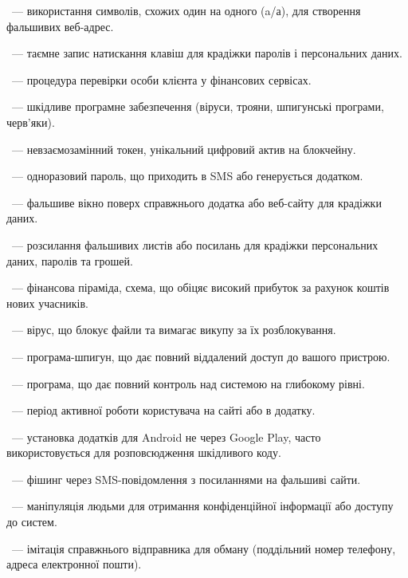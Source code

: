 ~--- використання символів, схожих один на одного (a/а), для створення фальшивих веб-адрес.

~--- таємне запис натискання клавіш для крадіжки паролів і персональних даних.

~--- процедура перевірки особи клієнта у фінансових сервісах.

~--- шкідливе програмне забезпечення (віруси, трояни, шпигунські програми, черв'яки).

~--- невзаємозамінний токен, унікальний цифровий актив на блокчейну.

~--- одноразовий пароль, що приходить в SMS або генерується додатком.

~--- фальшиве вікно поверх справжнього додатка або веб-сайту для крадіжки даних.

~--- розсилання фальшивих листів або посилань для крадіжки персональних даних, паролів та грошей.

~--- фінансова піраміда, схема, що обіцяє високий прибуток за рахунок коштів нових учасників.

~--- вірус, що блокує файли та вимагає викупу за їх розблокування.

~--- програма-шпигун, що дає повний віддалений доступ до вашого пристрою.

~--- програма, що дає повний контроль над системою на глибокому рівні.

~--- період активної роботи користувача на сайті або в додатку.

~--- установка додатків для Android не через Google Play, часто використовується для розповсюдження шкідливого коду.

~--- фішинг через SMS-повідомлення з посиланнями на фальшиві сайти.

~--- маніпуляція людьми для отримання конфіденційної інформації або доступу до систем.

~--- імітація справжнього відправника для обману (поддільний номер телефону, адреса електронної пошти).

